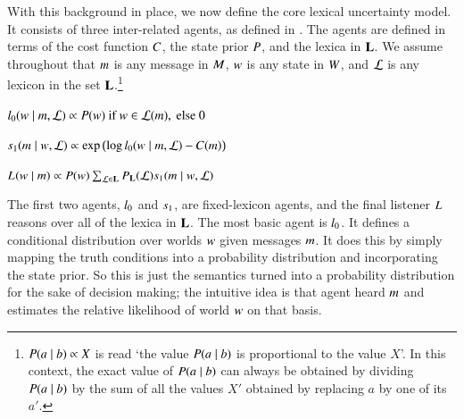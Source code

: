 \documentclass[leqno,12pt]{article}
\begin{document}
With this background in place, we now define the core lexical
uncertainty model. It consists of three inter-related agents, as
defined in . The agents are defined in terms of the cost
function $C$, the state prior $P$, and the lexica in
$\mathbf{L}$. We assume throughout that $m$ is any message in
$M$, $w$ is any state in $W$, and $\mathcal{L}$ is any
lexicon in the set $\mathbf{L}$.\footnote{$P(a \mid b) \propto X$ is
  read `the value $P(a \mid b)$ is proportional to the value
  $X$'. In this context, the exact value of $P(a \mid b)$ can always
  be obtained by dividing $P(a \mid b)$ by the sum of all the values
  $X'$ obtained by replacing $a$ by one of its $a'$.}
%
\begin{examples}
\item\label{agents}
  \begin{examples}

  \item\label{l0}%
    $l_{0}(w \mid m, \mathcal{L}) \propto P(w) \text{ if } w \in \mathcal{L}(m), \text{ else } 0$


  \item\label{s1}%
    $s_{1}(m \mid w, \mathcal{L}) \propto
    \exp
    \left(
      \log l_{0}(w \mid m, \mathcal{L})
      - 
      C(m)
    \right)$
    
  \item\label{L} 
    $L_{}(w \mid m) 
    \propto 
    P(w)
    \sum_{\mathcal{L} \in \mathbf{L}}
    P_{\mathbf{L}}(\mathcal{L})
    s_{1}(m \mid w, \mathcal{L})$
  \end{examples}
\end{examples}

The first two agents, $l_{0}$ and $s_{1}$, are
fixed-lexicon agents, and the final listener $L_{}$
reasons over all of the lexica in $\mathbf{L}$.  The most basic agent is
$l_{0}$. It defines a conditional distribution over worlds
$w$ given messages $m$. It does this by simply mapping the
truth conditions into a probability distribution and incorporating the
state prior. So this is just the semantics turned into a probability
distribution for the sake of decision making; the intuitive idea is
that agent heard $m$ and estimates the relative likelihood of world
$w$ on that basis.
\end{document}
